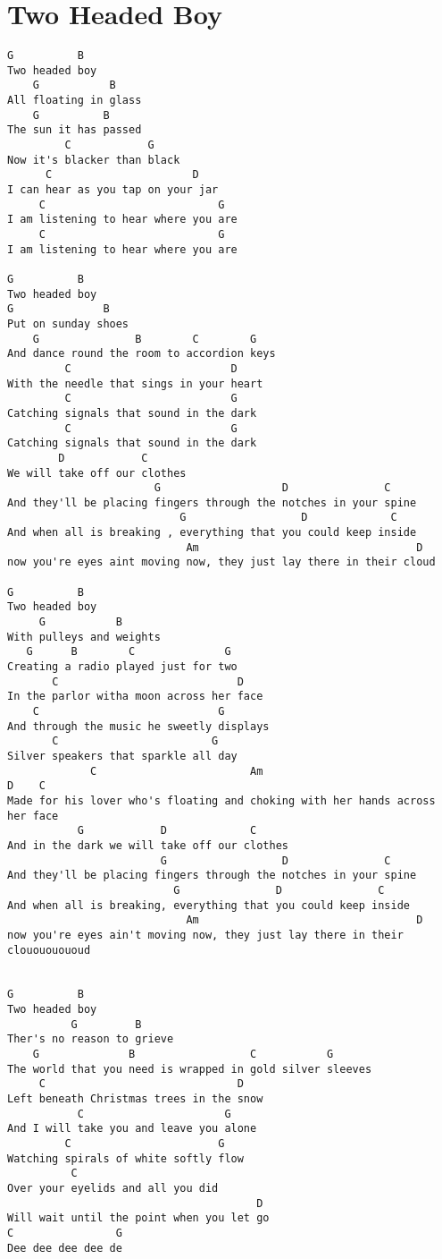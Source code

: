 \documentclass[leqno]{memoir}
\begin{document}
\chapter{Two Headed Boy}
\begin{verbatim}
G          B
Two headed boy
    G           B
All floating in glass
    G          B
The sun it has passed
         C            G 
Now it's blacker than black
      C                      D
I can hear as you tap on your jar
     C                           G
I am listening to hear where you are
     C                           G
I am listening to hear where you are

G          B
Two headed boy
G              B
Put on sunday shoes
    G               B        C        G
And dance round the room to accordion keys
         C                         D
With the needle that sings in your heart
         C                         G
Catching signals that sound in the dark
         C                         G
Catching signals that sound in the dark
        D            C           
We will take off our clothes
                       G                   D               C
And they'll be placing fingers through the notches in your spine
                           G                  D             C
And when all is breaking , everything that you could keep inside
                            Am                                  D
now you're eyes aint moving now, they just lay there in their cloud

G          B
Two headed boy
     G           B
With pulleys and weights
   G      B        C              G
Creating a radio played just for two
       C                            D
In the parlor witha moon across her face
    C                            G
And through the music he sweetly displays
       C                        G
Silver speakers that sparkle all day
             C                        Am                                D    C
Made for his lover who's floating and choking with her hands across her face
           G            D             C
And in the dark we will take off our clothes
                        G                  D               C
And they'll be placing fingers through the notches in your spine
                          G               D               C
And when all is breaking, everything that you could keep inside
                            Am                                  D
now you're eyes ain't moving now, they just lay there in their clouououououd


G          B
Two headed boy
          G         B 
Ther's no reason to grieve 
    G              B                  C           G
The world that you need is wrapped in gold silver sleeves
     C                              D
Left beneath Christmas trees in the snow
           C                      G
And I will take you and leave you alone
         C                       G
Watching spirals of white softly flow
          C
Over your eyelids and all you did
                                       D
Will wait until the point when you let go
C                G
Dee dee dee dee de
\end{verbatim}
\newpage
\end{document}

